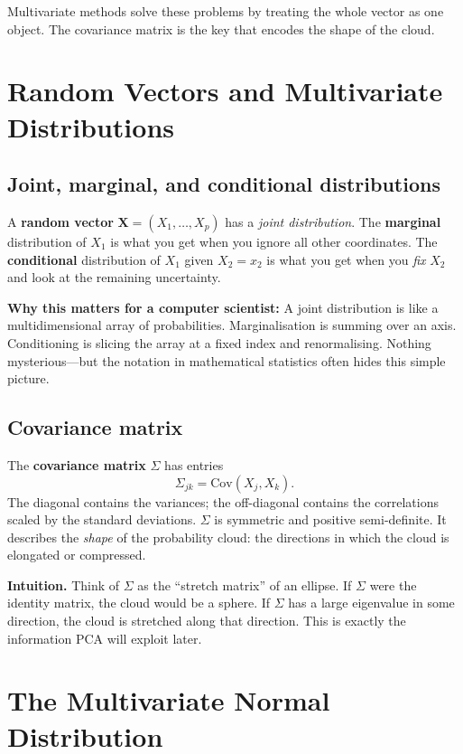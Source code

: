 \documentclass[11pt,a4paper]{article}
\newcommand{\vect}[1]{\mathbf{#1}}
\newcommand{\Cov}{\mathrm{Cov}}
\begin{document}
Multivariate methods solve these problems by treating the whole vector
as one object.  The covariance matrix is the key that encodes the
shape of the cloud.

\section{Random Vectors and Multivariate Distributions}

\subsection{Joint, marginal, and conditional distributions}
A \textbf{random vector} $\vect{X}=(X_1,\dots,X_p)$ has a
\emph{joint distribution}.  The \textbf{marginal} distribution of
$X_1$ is what you get when you ignore all other coordinates.
The \textbf{conditional} distribution of $X_1$ given $X_2=x_2$ is what
you get when you \emph{fix} $X_2$ and look at the remaining
uncertainty.

\textbf{Why this matters for a computer scientist:}
A joint distribution is like a multidimensional array of probabilities.
Marginalisation is summing over an axis.  Conditioning is slicing the
array at a fixed index and renormalising.  Nothing mysterious—but the
notation in mathematical statistics often hides this simple picture.

\subsection{Covariance matrix}
The \textbf{covariance matrix} $\Sigma$ has entries
\[
\Sigma_{jk} = \Cov(X_j,X_k).
\]
The diagonal contains the variances; the off-diagonal contains the
correlations scaled by the standard deviations.
$\Sigma$ is symmetric and positive semi-definite.  It describes the
\emph{shape} of the probability cloud: the directions in which the
cloud is elongated or compressed.

\textbf{Intuition.}  Think of $\Sigma$ as the ``stretch matrix'' of an
ellipse.  If $\Sigma$ were the identity matrix, the cloud would be a
sphere.  If $\Sigma$ has a large eigenvalue in some direction, the
cloud is stretched along that direction.  This is exactly the
information PCA will exploit later.

\section{The Multivariate Normal Distribution}
\end{document}

